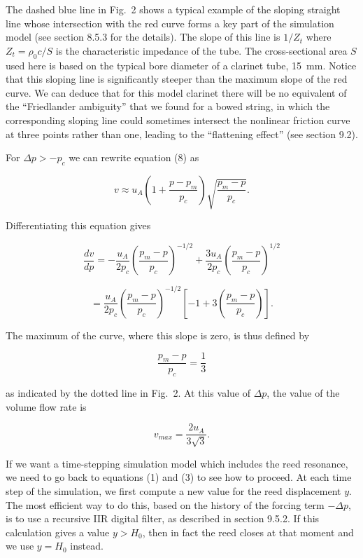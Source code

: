   The dashed blue line in Fig.\ 2 shows a typical example of the sloping 
  straight line whose intersection with the red curve forms a key part of the 
  simulation model (see section 8.5.3 for the details). The slope of this line 
  is $1/Z_t$ where $Z_t=\rho_0 c/S$ is the characteristic impedance of the 
  tube. The cross-sectional area $S$ used here is based on the typical bore 
  diameter of a clarinet tube, 15~mm. Notice that this sloping line is 
  significantly steeper than the maximum slope of the red curve. We can deduce 
  that for this model clarinet there will be no equivalent of the ``Friedlander 
  ambiguity'' that we found for a bowed string, in which the corresponding 
  sloping line could sometimes intersect the nonlinear friction curve at three 
  points rather than one, leading to the ``flattening effect'' (see section 
  9.2). 

  For $\Delta p > -p_c$ we can rewrite equation (8) as 

  \begin{equation*}v \approx u_A\left(1+ \dfrac{p-p_m}{p_c}\right) 
  \sqrt{\dfrac{p_m-p}{p_c}} .\tag{10}\end{equation*} 

  Differentiating this equation gives 

  \begin{equation*}\dfrac{dv}{dp}= -\dfrac{u_A}{2p_c} 
  \left(\dfrac{p_m-p}{p_c}\right)^{-1/2} +\dfrac{3u_A}{2p_c} 
  \left(\dfrac{p_m-p}{p_c}\right)^{1/2}\end{equation*} 

  \begin{equation*}=\dfrac{u_A}{2p_c} \left(\dfrac{p_m-p}{p_c}\right)^{-1/2} 
  \left[-1 + 3\left( \dfrac{p_m-p}{p_c} \right) \right] . 
  \tag{11}\end{equation*} 

  The maximum of the curve, where this slope is zero, is thus defined by 

  \begin{equation*}\dfrac{p_m-p}{p_c}=\dfrac{1}{3} \tag{12}\end{equation*} 

  \noindent{}as indicated by the dotted line in Fig.\ 2. At this value of 
  $\Delta p$, the value of the volume flow rate is 

  \begin{equation*}v_{max}=\dfrac{2u_A}{3 \sqrt{3}} . \tag{13}\end{equation*} 

  If we want a time-stepping simulation model which includes the reed 
  resonance, we need to go back to equations (1) and (3) to see how to proceed. 
  At each time step of the simulation, we first compute a new value for the 
  reed displacement $y$. The most efficient way to do this, based on the 
  history of the forcing term $-\Delta p$, is to use a recursive IIR digital 
  filter, as described in section 9.5.2. If this calculation gives a value $y > 
  H_0$, then in fact the reed closes at that moment and we use $y=H_0$ instead. 

